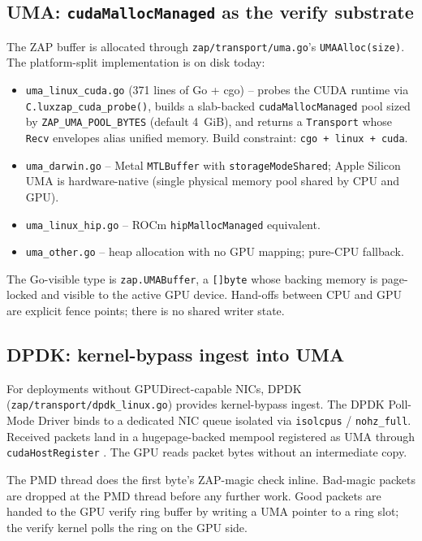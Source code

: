 \subsection{UMA: \texttt{cudaMallocManaged} as the verify substrate}

The ZAP buffer is allocated through
\texttt{zap/transport/uma.go}'s \texttt{UMAAlloc(size)}. The
platform-split implementation is on disk today:

\begin{itemize}[leftmargin=2em,nosep]
\item \texttt{uma\_linux\_cuda.go} (\num{371} lines of Go +
  cgo) -- probes the CUDA runtime via
  \texttt{C.luxzap\_cuda\_probe()}, builds a slab-backed
  \texttt{cudaMallocManaged} pool sized by
  \texttt{ZAP\_UMA\_POOL\_BYTES} (default \SI{4}{GiB}), and
  returns a \texttt{Transport} whose \texttt{Recv} envelopes
  alias unified memory. Build constraint:
  \texttt{cgo + linux + cuda}.
\item \texttt{uma\_darwin.go} -- Metal \texttt{MTLBuffer} with
  \texttt{storageModeShared}; Apple Silicon UMA is
  hardware-native (single physical memory pool shared by CPU
  and GPU).
\item \texttt{uma\_linux\_hip.go} -- ROCm
  \texttt{hipMallocManaged} equivalent.
\item \texttt{uma\_other.go} -- heap allocation with no GPU
  mapping; pure-CPU fallback.
\end{itemize}

The Go-visible type is \texttt{zap.UMABuffer}, a \texttt{[]byte}
whose backing memory is page-locked and visible to the active
GPU device. Hand-offs between CPU and GPU are explicit fence
points; there is no shared writer state.

\subsection{DPDK: kernel-bypass ingest into UMA}

For deployments without GPUDirect-capable NICs, DPDK
(\texttt{zap/transport/dpdk\_linux.go}) provides kernel-bypass
ingest. The DPDK Poll-Mode Driver binds to a dedicated NIC queue
isolated via \texttt{isolcpus} / \texttt{nohz\_full}. Received
packets land in a hugepage-backed mempool registered as UMA
through \texttt{cudaHostRegister} \cite{dpdk}. The GPU reads
packet bytes without an intermediate copy.

The PMD thread does the first byte's ZAP-magic check inline.
Bad-magic packets are dropped at the PMD thread before any
further work. Good packets are handed to the GPU verify ring
buffer by writing a UMA pointer to a ring slot; the verify
kernel polls the ring on the GPU side.

